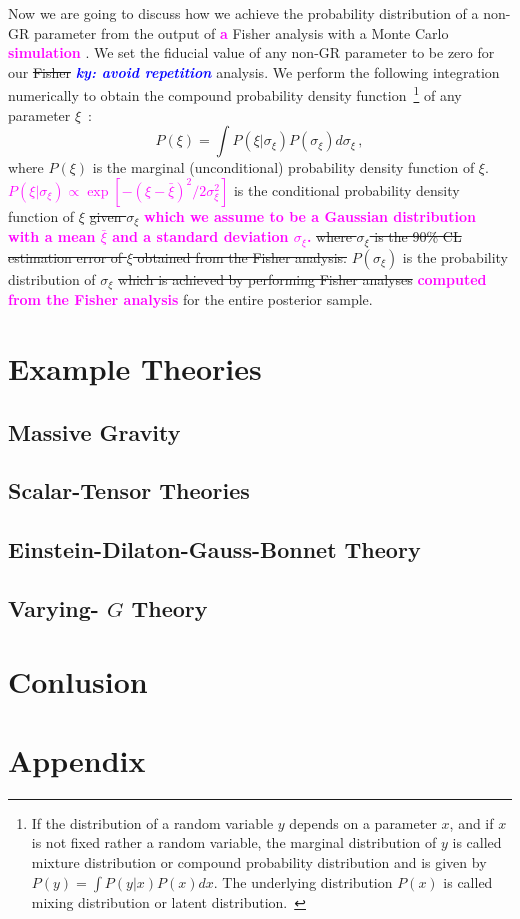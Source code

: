\documentclass[prd,twocolumn,nofootinbib]{revtex4-1}
\newcommand\be{\begin{equation}}
\newcommand\ee{\end{equation}}
\newcommand{\lb}{\left(}
\newcommand{\rb}{\right)}
\newcommand{\ky}[1]{\textcolor{blue}{\it{\textbf{ky: #1}}} }
\newcommand{\kent}[1]{\textcolor{magenta}{\textbf{#1}} }
\begin{document}
Now we are going to discuss how we achieve the probability distribution of a non-GR parameter from the output of \kent{a} Fisher analysis with a Monte Carlo \kent{simulation}. We set the  fiducial value of any non-GR parameter to be zero for our \sout{Fisher} \ky{avoid repetition} analysis. We perform the following integration numerically to obtain the compound probability density function~\footnote{If the distribution of a random variable $y$ depends on a parameter $x$, and if $x$ is not fixed rather a random variable, the marginal distribution of $y$ is called mixture distribution or compound probability distribution and is given by $P\left(y\right)=\int P\left(y|x\right) P\left(x\right)dx$. The underlying distribution $P\left(x\right)$ is called mixing distribution or latent distribution.~\cite{2016arXiv160204060R}} of any parameter $\xi$~:
\be
\label{eq3:1}
P\lb\xi\rb=\int P\lb \xi|\sigma_{\xi}\rb P\lb \sigma_{\xi}\rb d\sigma_{\xi}\,,
\ee
where $P\lb\xi\rb$ is the marginal (unconditional) probability density function of $\xi$. \kent{$P\lb \xi|\sigma_{\xi}\rb \propto \exp[-(\xi-\bar \xi)^2/2\sigma_{\xi}^2]$} is the conditional probability density function of $\xi$ \sout{given $\sigma_\xi$} \kent{which we assume to be a Gaussian distribution with a mean $\bar \xi$ and a standard deviation $\sigma_\xi$.} \sout{where $\sigma_\xi$ is the 90\% CL estimation error of $\xi$ obtained from the Fisher analysis.} $P\lb\sigma_\xi\rb$ is the probability distribution of $\sigma_\xi$ \sout{which is achieved by performing Fisher analyses} \kent{computed from the Fisher analysis} for the entire posterior sample.
\section{Example Theories}
\subsection{Massive Gravity}
\subsection{Scalar-Tensor Theories}
\subsection{Einstein-Dilaton-Gauss-Bonnet Theory}
\subsection{Varying- $G$ Theory}
\section{Conlusion}
\section{Appendix}

\end{document}

